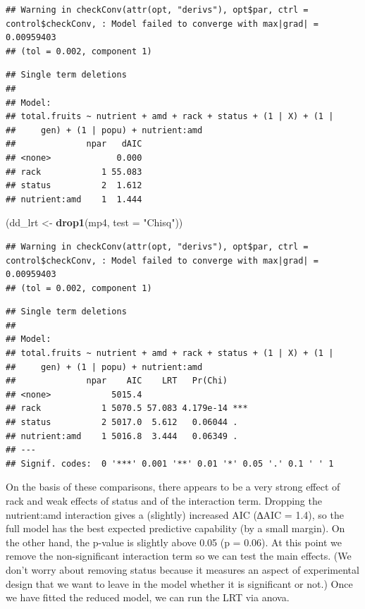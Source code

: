 \documentclass[
  12pt,
]{book}
\newenvironment{Shaded}{\begin{snugshade}}{\end{snugshade}}
\newcommand{\DataTypeTok}[1]{\textcolor[rgb]{0.13,0.29,0.53}{#1}}
\newcommand{\KeywordTok}[1]{\textcolor[rgb]{0.13,0.29,0.53}{\textbf{#1}}}
\newcommand{\NormalTok}[1]{#1}
\newcommand{\StringTok}[1]{\textcolor[rgb]{0.31,0.60,0.02}{#1}}
\begin{document}
\begin{verbatim}
## Warning in checkConv(attr(opt, "derivs"), opt$par, ctrl = control$checkConv, : Model failed to converge with max|grad| = 0.00959403
## (tol = 0.002, component 1)
\end{verbatim}

\begin{verbatim}
## Single term deletions
## 
## Model:
## total.fruits ~ nutrient + amd + rack + status + (1 | X) + (1 | 
##     gen) + (1 | popu) + nutrient:amd
##              npar   dAIC
## <none>             0.000
## rack            1 55.083
## status          2  1.612
## nutrient:amd    1  1.444
\end{verbatim}

\begin{Shaded}
\begin{Highlighting}[]
\NormalTok{(dd\_lrt \textless{}{-}}\StringTok{ }\KeywordTok{drop1}\NormalTok{(mp4, }\DataTypeTok{test =} \StringTok{"Chisq"}\NormalTok{))}
\end{Highlighting}
\end{Shaded}

\begin{verbatim}
## Warning in checkConv(attr(opt, "derivs"), opt$par, ctrl = control$checkConv, : Model failed to converge with max|grad| = 0.00959403
## (tol = 0.002, component 1)
\end{verbatim}

\begin{verbatim}
## Single term deletions
## 
## Model:
## total.fruits ~ nutrient + amd + rack + status + (1 | X) + (1 | 
##     gen) + (1 | popu) + nutrient:amd
##              npar    AIC    LRT   Pr(Chi)    
## <none>            5015.4                     
## rack            1 5070.5 57.083 4.179e-14 ***
## status          2 5017.0  5.612   0.06044 .  
## nutrient:amd    1 5016.8  3.444   0.06349 .  
## ---
## Signif. codes:  0 '***' 0.001 '**' 0.01 '*' 0.05 '.' 0.1 ' ' 1
\end{verbatim}

On the basis of these comparisons, there appears to be a very strong effect of rack and weak effects of status and of the interaction term. Dropping the nutrient:amd interaction gives a (slightly) increased AIC (∆AIC = 1.4), so the full model has the best expected predictive capability (by a small margin). On the other hand, the p-value is slightly above 0.05 (p = 0.06). At this point we remove the non-significant interaction term so we can test the main effects. (We don't worry about removing status because it measures an aspect of experimental design that we want to leave in the model whether it is significant or not.) Once we have fitted the reduced model, we can run the LRT via anova.
\end{document}
